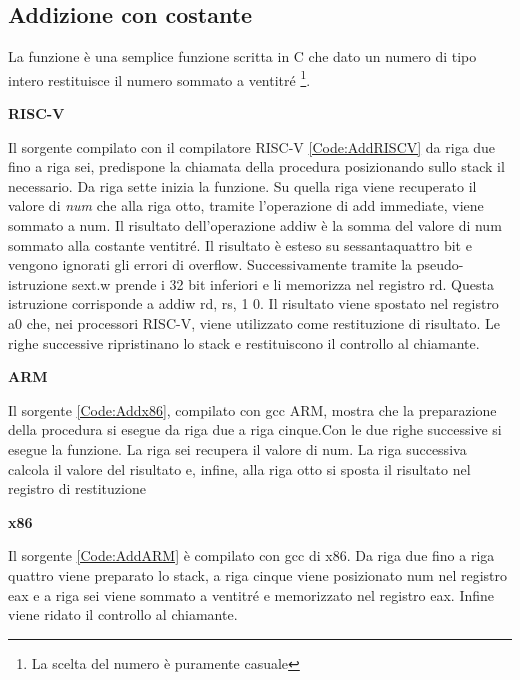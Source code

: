 \documentclass[12pt, a4paper]{report}
\begin{document}
\subsection{Addizione con costante}



La funzione è una semplice funzione scritta in C che dato un numero di tipo intero restituisce il numero sommato a ventitré \footnote{La scelta del numero è puramente casuale}.
  
\vspace{0.3 cm}
\textbf{RISC-V}

\vspace{0.3 cm}
Il sorgente compilato con il compilatore RISC-V \ref{Code:AddRISCV} da riga due fino a riga sei, predispone la chiamata della procedura posizionando sullo stack il necessario. Da riga sette inizia la funzione. Su quella riga viene recuperato il valore di \textit{num} che alla riga otto, tramite l'operazione di add immediate, viene sommato a num. Il risultato dell'operazione addiw è la somma del valore di num sommato alla costante ventitré. Il risultato è esteso su sessantaquattro bit e vengono ignorati gli errori di overflow. Successivamente tramite la pseudo-istruzione sext.w prende i 32 bit inferiori e li memorizza nel registro rd. Questa istruzione corrisponde a addiw rd, rs, 1 0. Il risultato viene spostato nel registro a0 che, nei processori RISC-V, viene utilizzato come restituzione di risultato. Le righe successive ripristinano lo stack e restituiscono il controllo al chiamante.

\vspace{0.3 cm}
\textbf{ARM}

\vspace{0.3 cm}

Il sorgente \ref{Code:Addx86}, compilato con gcc ARM, mostra che la preparazione della procedura si esegue da riga due a riga cinque.Con le due righe successive si esegue la funzione. La riga sei recupera il valore di num. La riga successiva calcola il valore del risultato e, infine, alla riga otto si sposta il risultato nel registro di restituzione


\vspace{0.3 cm}
\textbf{x86}

Il sorgente \ref{Code:AddARM} è compilato con gcc di x86. Da riga due fino a riga quattro viene preparato lo stack, a riga cinque viene posizionato num nel registro eax e a riga sei viene sommato a ventitré e memorizzato nel registro eax. Infine viene ridato il controllo al chiamante.
\end{document}
